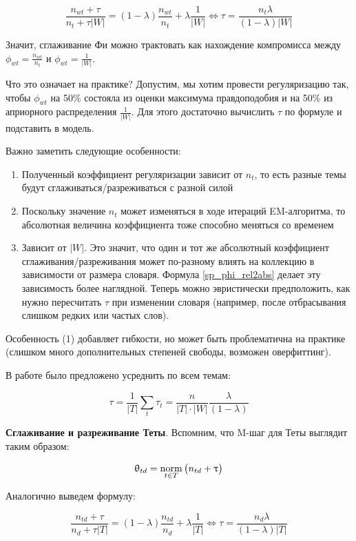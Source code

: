 \[
\frac{n_{wt} + \tau}{n_{t} + \tau |W|} = (1-\lambda) \frac{n_{wt}}{n_t} + \lambda \frac{1}{|W|} \iff \tau  = \frac{n_t \lambda}{(1-\lambda) |W|} \label{sp_phi_rel2abs}
\]

Значит, сглаживание Фи можно трактовать как нахождение компромисса между $\phi_{wt} = \frac{n_{wt}}{n_t}$ и $\phi_{wt} = \frac{1}{|W|}$.

Что это означает на практике? Допустим, мы хотим провести регуляризацию так, чтобы $\phi_{wt}$ на 50\% состояла из оценки максимума правдоподобия и на 50\% из априорного распределения $\frac{1}{|W|}$. Для этого достаточно вычислить $\tau$ по формуле и подставить в модель.

Важно заметить следующие особенности:

\begin{enumerate}
    \item  {Полученный коэффициент регуляризации зависит от $n_t$, то есть разные темы будут сглаживаться/разреживаться с разной силой}
    \item  {Поскольку значение $n_t$ может изменяться в ходе итераций EM-алгоритма, то абсолютная величина коэффициента тоже способно меняться со временем}
    \item  {Зависит от $|W|$. Это значит, что один и тот же абсолютный коэффициент сглаживания/разреживания может по-разному влиять на коллекцию в зависимости от размера словаря.  Формула \ref{sp_phi_rel2abs} делает эту зависимость более наглядной. Теперь можно эвристически предположить, как нужно пересчитать $\tau$ при изменении словаря (например, после отбрасывания слишком редких или частых слов).}
\end{enumerate}

Особенность (1) добавляет гибкости, но может быть проблематична на практике (слишком много дополнительных степеней свободы, возможен оверфиттинг).

В работе \cite{doykov} было предложено усреднить по всем темам:

\[
\tau = \frac{1}{|T|} \sum_t \tau_t = \frac{n}{|T|\cdot|W|} \frac{\lambda}{(1-\lambda)}
\]

\textbf{Сглаживание и разреживание Теты}. Вспомним, что M-шаг для Теты выглядит таким образом:

\[
\uptheta_{td} = \mathop{\mathrm{norm}}\limits_{t \in T} \big( n_{td} + \uptau \big)
\]

Аналогично выведем формулу:

\[
\frac{n_{td} + \tau}{n_d + \tau |T|} = (1-\lambda) \frac{n_{td}}{n_d} + \lambda \frac{1}{|T|} \iff \tau = \frac{n_d \lambda}{(1-\lambda) |T|} \label{sp_theta_rel2abs}
\]


